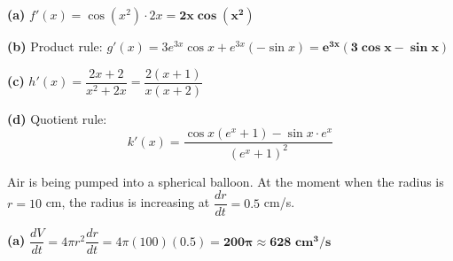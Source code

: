 \documentclass[addpoints]{exam}
\begin{document}
\begin{questions}
\begin{solution}[9cm]
\textbf{(a)} $f'(x) = \cos(x^2) \cdot 2x = \mathbf{2x\cos(x^2)}$

\textbf{(b)} Product rule:
$g'(x) = 3e^{3x}\cos x + e^{3x}(-\sin x) = \mathbf{e^{3x}(3\cos x - \sin x)}$

\textbf{(c)}
$h'(x) = \dfrac{2x + 2}{x^2 + 2x} = \dfrac{2(x+1)}{x(x+2)}$

\textbf{(d)} Quotient rule:
\[
k'(x) = \frac{\cos x(e^x + 1) - \sin x \cdot e^x}{(e^x + 1)^2}
\]
\end{solution}

\question Air is being pumped into a spherical balloon. At the moment when the radius is
$r = 10$ cm, the radius is increasing at $\dfrac{dr}{dt} = 0.5$ cm/s.
\begin{solution}[9cm]
\textbf{(a)} $\dfrac{dV}{dt} = 4\pi r^2 \dfrac{dr}{dt} = 4\pi(100)(0.5) = \mathbf{200\pi \approx 628 \text{ cm}^3/\text{s}}$


\end{solution}
\end{questions}
\end{document}
